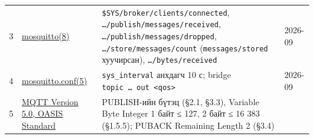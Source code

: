 \begin{longtable}[]{@{}llll@{}}
\begin{minipage}[t]{0.22\columnwidth}
3\strut
\end{minipage} & \begin{minipage}[t]{0.22\columnwidth}\raggedright
\href{https://mosquitto.org/man/mosquitto-8.html}{mosquitto(8)}\strut
\end{minipage} & \begin{minipage}[t]{0.22\columnwidth}\raggedright
\texttt{\$SYS/\allowbreak{}broker/\allowbreak{}clients/\allowbreak{}connected}, \texttt{\ldots{}/\allowbreak{}publish/\allowbreak{}messages/\allowbreak{}received}, \texttt{\ldots{}/\allowbreak{}publish/\allowbreak{}messages/\allowbreak{}dropped}, \texttt{\ldots{}/\allowbreak{}store/\allowbreak{}messages/\allowbreak{}count} (\texttt{messages/stored} хуучирсан), \texttt{\ldots{}/\allowbreak{}bytes/\allowbreak{}received}\strut
\end{minipage} & \begin{minipage}[t]{0.22\columnwidth}\raggedright
2026-09\strut
\end{minipage}\tabularnewline
\begin{minipage}[t]{0.22\columnwidth}\raggedright
4\strut
\end{minipage} & \begin{minipage}[t]{0.22\columnwidth}\raggedright
\href{https://mosquitto.org/man/mosquitto-conf-5.html}{mosquitto.conf(5)}\strut
\end{minipage} & \begin{minipage}[t]{0.22\columnwidth}\raggedright
\texttt{sys\_interval} анхдагч 10 с; bridge \texttt{topic\ \ldots{}\ out\ \textless{}qos\textgreater{}}\strut
\end{minipage} & \begin{minipage}[t]{0.22\columnwidth}\raggedright
2026-09\strut
\end{minipage}\tabularnewline
\begin{minipage}[t]{0.22\columnwidth}\raggedright
5\strut
\end{minipage} & \begin{minipage}[t]{0.22\columnwidth}\raggedright
\href{https://docs.oasis-open.org/mqtt/mqtt/v5.0/mqtt-v5.0.html}{MQTT Version 5.\allowbreak{}0, OASIS Standard}\strut
\end{minipage} & \begin{minipage}[t]{0.22\columnwidth}\raggedright
PUBLISH-ийн бүтэц (§2.1, §3.3), Variable Byte Integer 1 байт ≤ 127, 2 байт ≤ 16 383 (§1.5.5); PUBACK Remaining Length 2 (§3.4)\strut
\end{minipage} & \begin{minipage}[t]{0.22\columnwidth}\raggedright

\end{minipage}
\end{longtable}
